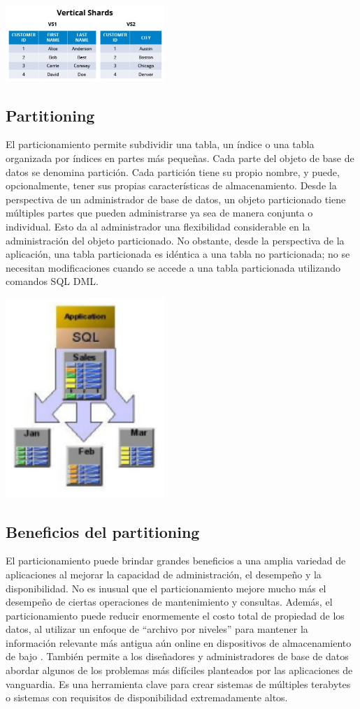 \documentclass{article}
\begin{document}
\begin{multicols}{2}
\includegraphics[width=6cm]{images/vertical.jpg}


\subsection{Partitioning}
El particionamiento permite subdividir una tabla, un índice o una tabla organizada por índices en partes
más pequeñas. Cada parte del objeto de base de datos se denomina partición. Cada partición tiene su
propio nombre, y puede, opcionalmente, tener sus propias características de almacenamiento. Desde la
perspectiva de un administrador de base de datos, un objeto particionado tiene múltiples partes que
pueden administrarse ya sea de manera conjunta o individual. Esto da al administrador una flexibilidad
considerable en la administración del objeto particionado. No obstante, desde la perspectiva de la
aplicación, una tabla particionada es idéntica a una tabla no particionada; no se necesitan modificaciones
cuando se accede a una tabla particionada utilizando comandos SQL DML.

\includegraphics[width=6cm]{images/partitioning.png}

\subsection{Beneficios del partitioning}
El particionamiento puede brindar grandes beneficios a una amplia variedad de aplicaciones al mejorar
la capacidad de administración, el desempeño y la disponibilidad. No es inusual que el particionamiento
mejore mucho más el desempeño de ciertas operaciones de mantenimiento y consultas. Además, el
particionamiento puede reducir enormemente el costo total de propiedad de los datos, al utilizar un
enfoque de “archivo por niveles” para mantener la información relevante más antigua aún online en
dispositivos de almacenamiento de bajo .
También permite a los diseñadores y administradores de base de datos abordar
algunos de los problemas más difíciles planteados por las aplicaciones de vanguardia. Es una
herramienta clave para crear sistemas de múltiples terabytes o sistemas con requisitos de disponibilidad
extremadamente altos.


\end{multicols}
\end{document}

